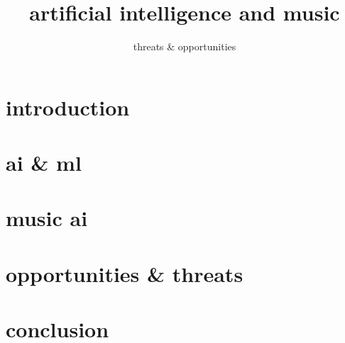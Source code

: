 

\title{artificial intelligence and music}
\subtitle{threats \& opportunities} 


	

    \section[intro]{introduction}
        

    \section{ai \& ml}
        
        
    \section{music ai}
        
    
    \section[opportunities \& threats]{opportunities \& threats}
        
        
    \section{conclusion}
        
        



